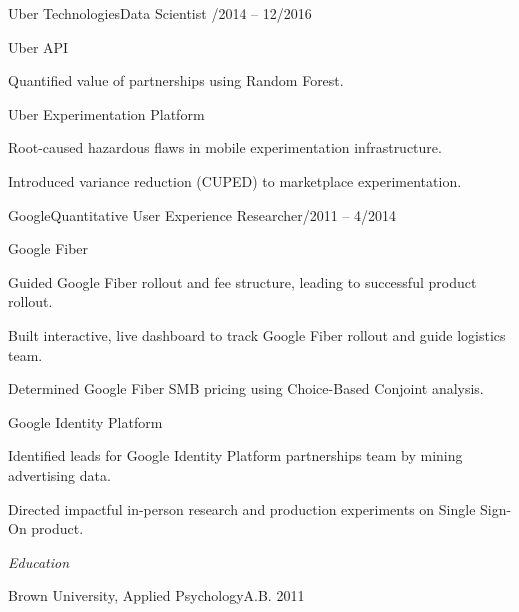 \documentclass[12pt]{res}
\begin{document}
{\begin{resume}
\begin{list}{}{\leftmargin=1em}
{\begin{list}{}{\leftmargin=1em}
\item Uber Technologies\dotfill Data Scientist /2014 -- 12/2016
\begin{list}{}{\leftmargin=1em}
\item Uber API
\begin{list}{-}{\leftmargin=1em}
\item Quantified value of partnerships using Random Forest.
\end{list}
\item Uber Experimentation Platform
\begin{list}{-}{\leftmargin=1em}
\item Root-caused hazardous flaws in mobile experimentation infrastructure.
\item Introduced variance reduction (CUPED) to marketplace experimentation.
\end{list}
\end{list}
\vspace{4mm}
\item Google\dotfill Quantitative User Experience Researcher/2011 -- 4/2014
\begin{list}{}{\leftmargin=1em}
\item Google Fiber
\begin{list}{-}{\leftmargin=1em}
\item Guided Google Fiber rollout and fee structure, leading to successful product rollout.
\item Built interactive, live dashboard to track Google Fiber rollout and guide logistics team.
\item Determined Google Fiber SMB pricing using Choice-Based Conjoint analysis.
\end{list}
\item Google Identity Platform
\begin{list}{-}{\leftmargin=1em}
\item Identified leads for Google Identity Platform partnerships team by mining advertising data.
\item Directed impactful in-person research and production experiments on Single Sign-On product.
\end{list}
\end{list}
\end{list}}
\vspace{5mm}
\item{\textit{Education}
\vspace{6mm}
\begin{list}{}{\leftmargin=1em}
\item Brown University, Applied Psychology\dotfill A.B. 2011
\end{list}}
\end{list}
\vspace{8mm}

\end{resume}
} %
\end{document}
